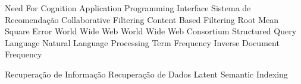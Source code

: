 \begin{acronym}[ACRONYM] 

 {Need For Cognition}
 {Application Programming Interface}
 {Sistema de Recomendação}
 {Collaborative Filtering}
 {Content Based Filtering}
 {Root Mean Square Error}
 {World Wide Web}
 {World Wide Web Consortium}
 {Structured Query Language}
 {Natural Language Processing}
 {Term Frequency Inverse Document Frequency}

 {Recuperação de Informação}
 {Recuperação de Dados}
 {Latent Semantic Indexing}
    
\end{acronym}